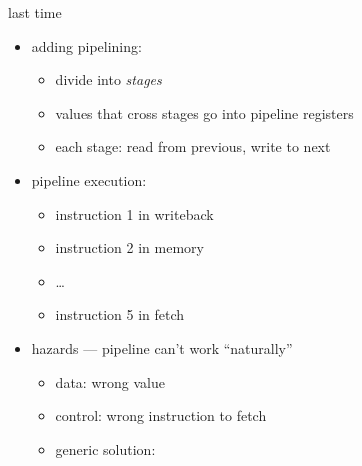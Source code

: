 \begin{frame}{last time}
    \begin{itemize}
    \item adding pipelining:
        \begin{itemize}
        \item divide into \textit{stages}
        \item values that cross stages go into pipeline registers
        \item each stage: read from previous, write to next
        \end{itemize}
    \item pipeline execution:
        \begin{itemize}
        \item instruction 1 in writeback
        \item instruction 2 in memory
        \item \ldots
        \item instruction 5 in fetch
        \end{itemize}
    \item hazards --- pipeline can't work ``naturally''
        \begin{itemize}
        \item data: wrong value
        \item control: wrong instruction to fetch
        \item generic solution: 
        \end{itemize}
    \end{itemize}
\end{frame}
